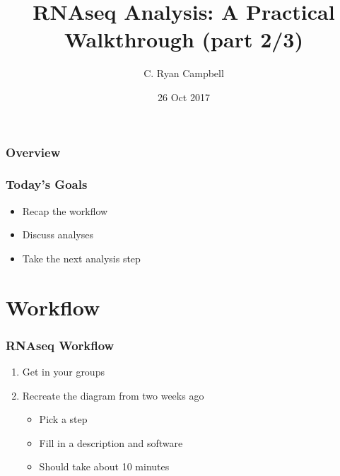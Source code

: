 \documentclass[14pt,handout]{beamer}
\title[RNAseq Practical pt2]{RNAseq Analysis: A Practical Walkthrough (part 2/3)} %
\author{C. Ryan Campbell} %
\institute[Duke] %
{
Duke University \\ %
\medskip
\textit{c.ryan.campbell@duke.edu} %
}
\date{26 Oct 2017} %
\begin{document}
\begin{frame}
\titlepage %
\end{frame}

\begin{frame}
\frametitle{Overview} %
\tableofcontents %
\end{frame}


\begin{frame}
\frametitle{Today's Goals}
\begin{itemize}
	\item<+-> Recap the workflow
	\item<+-> Discuss analyses
	\item<+-> Take the next analysis step
\end{itemize}
\end{frame}

\section{Workflow}

\begin{frame}
\frametitle{RNAseq Workflow}
\begin{enumerate}
	\large
	\item<+-> Get in your groups
	\item<+-> Recreate the diagram from two weeks ago
	\begin{itemize}
		\item<+-> Pick a step
		\item<+-> Fill in a description and software
		\item<+-> Should take about 10 minutes
	\end{itemize}
\end{enumerate}
\end{frame}
\end{document}
